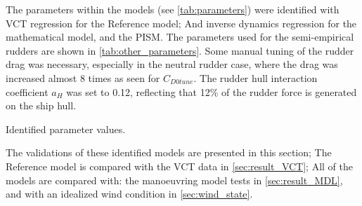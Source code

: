 The parameters within the models (see \autoref{tab:parameters}) were identified with VCT regression for the Reference model; And inverse dynamics regression for the mathematical model, and the PISM. 
The parameters used for the semi-empirical rudders are shown in \autoref{tab:other_parameters}. Some manual tuning of the rudder drag was necessary, especially in the neutral rudder case, where the drag was increased almost 8 times as seen for $C_{D0tune}$. The rudder hull interaction coefficient $a_H$ was set to 0.12, reflecting that 12\% of the rudder force is generated on the ship hull.
\begin{table}[h]
    \centering
    \caption{Identified parameter values.}
    \label{tab:parameters}
\end{table}

The validations of these identified models are presented in this section; The Reference model is compared with the VCT data in \autoref{sec:result_VCT}; All of the models are compared with: the manoeuvring model tests in \autoref{sec:result_MDL}, and with an idealized wind condition in \autoref{sec:wind_state}.